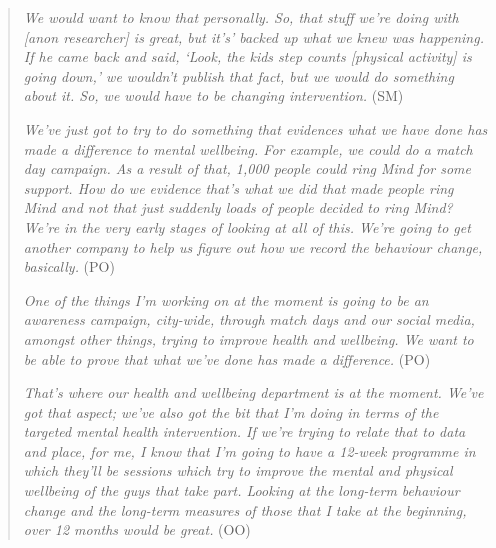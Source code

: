 \begin{quote}
    \textit{We would want to know that personally. So, that stuff we're doing with [anon researcher] is great, but it's' backed up what we knew was happening. If he came back and said, `Look, the kids step counts [physical activity] is going down,' we wouldn't publish that fact, but we would do something about it. So, we would have to be changing intervention.} (SM)
    
    \textit{We've just got to try to do something that evidences what we have done has made a difference to mental wellbeing. For example, we could do a match day campaign. As a result of that, 1,000 people could ring Mind for some support. How do we evidence that's what we did that made people ring Mind and not that just suddenly loads of people decided to ring Mind? We're in the very early stages of looking at all of this. We're going to get another company to help us figure out how we record the behaviour change, basically.} (PO)
    
    \textit{One of the things I'm working on at the moment is going to be an awareness campaign, city-wide, through match days and our social media, amongst other things, trying to improve health and wellbeing. We want to be able to prove that what we've done has made a difference.} (PO)
    
    \textit{That's where our health and wellbeing department is at the moment. We've got that aspect; we've also got the bit that I'm doing in terms of the targeted mental health intervention. If we're trying to relate that to data and place, for me, I know that I'm going to have a 12-week programme in which they'll be sessions which try to improve the mental and physical wellbeing of the guys that take part. Looking at the long-term behaviour change and the long-term measures of those that I take at the beginning, over 12 months would be great.} (OO)
\end{quote}

